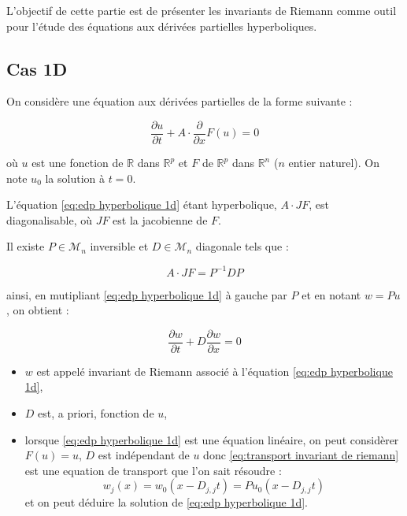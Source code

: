 
L'objectif de cette partie est de présenter les invariants de Riemann comme outil pour l'étude des équations aux dérivées partielles hyperboliques.

\subsection{Cas 1D}

On considère une équation aux dérivées partielles de la forme suivante :

\begin{equation}
\dfrac{\partial u}{\partial t} + A \cdot \dfrac{\partial}{\partial x} F(u) = 0
\label{eq:edp hyperbolique 1d}
\end{equation}

où $u$ est une fonction de $\mathbb{R}$ dans $\mathbb{R}^p$ et $F$ de $\mathbb{R}^p$ dans $\mathbb{R}^n$ ($n$ entier naturel). On note $u_0$ la solution à $t=0$.

L'équation \eqref{eq:edp hyperbolique 1d} étant hyperbolique, $A  \cdot J F$, est diagonalisable, où $J F$ est la jacobienne de $F$.

Il existe $P \in \mathcal{M}_n$ inversible et $D \in \mathcal{M}_ n$ diagonale tels que :

\begin{equation}
A \cdot JF = P^{-1} D P
\end{equation}

ainsi, en mutipliant \eqref{eq:edp hyperbolique 1d} à gauche par $P$ et en notant $w = P u$, on obtient :

\begin{equation}
\dfrac{\partial w}{\partial t} + D \dfrac{\partial w}{\partial x} = 0
\label{eq:transport invariant de riemann}
\end{equation}

\begin{remarque}
\begin{itemize}
\item $w$ est appelé invariant de Riemann associé à l'équation \eqref{eq:edp hyperbolique 1d},
\item $D$ est, a priori, fonction de $u$,
\item lorsque \eqref{eq:edp hyperbolique 1d} est une équation linéaire, on peut considèrer $F(u) = u$, $D$ est indépendant de $u$ donc \eqref{eq:transport invariant de riemann} est une equation de transport que l'on sait résoudre :
\begin{equation}
w_j(x) = w_0 ( x - D_{j,j} t) = P u_0 ( x - D_{j,j} t )
\end{equation} 
et on peut déduire la solution de \eqref{eq:edp hyperbolique 1d}.
\end{itemize}
\end{remarque}


